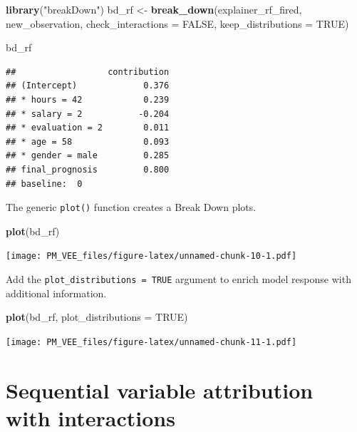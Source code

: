 \documentclass[]{krantz}
\newenvironment{Shaded}{\begin{snugshade}}{\end{snugshade}}
\newcommand{\DataTypeTok}[1]{\textcolor[rgb]{0.13,0.29,0.53}{#1}}
\newcommand{\KeywordTok}[1]{\textcolor[rgb]{0.13,0.29,0.53}{\textbf{#1}}}
\newcommand{\NormalTok}[1]{#1}
\newcommand{\OtherTok}[1]{\textcolor[rgb]{0.56,0.35,0.01}{#1}}
\newcommand{\StringTok}[1]{\textcolor[rgb]{0.31,0.60,0.02}{#1}}
\theoremstyle{definition}
\theoremstyle{definition}
\theoremstyle{definition}
\theoremstyle{remark}
\begin{document}
\begin{Shaded}
\begin{Highlighting}[]
\KeywordTok{library}\NormalTok{(}\StringTok{"breakDown"}\NormalTok{)}
\NormalTok{bd_rf <-}\StringTok{ }\KeywordTok{break_down}\NormalTok{(explainer_rf_fired,}
\NormalTok{                 new_observation,}
                 \DataTypeTok{check_interactions =} \OtherTok{FALSE}\NormalTok{,}
                 \DataTypeTok{keep_distributions =} \OtherTok{TRUE}\NormalTok{)}

\NormalTok{bd_rf}
\end{Highlighting}
\end{Shaded}

\begin{verbatim}
##                  contribution
## (Intercept)             0.376
## * hours = 42            0.239
## * salary = 2           -0.204
## * evaluation = 2        0.011
## * age = 58              0.093
## * gender = male         0.285
## final_prognosis         0.800
## baseline:  0
\end{verbatim}

The generic \texttt{plot()} function creates a Break Down plots.

\begin{Shaded}
\begin{Highlighting}[]
\KeywordTok{plot}\NormalTok{(bd_rf) }
\end{Highlighting}
\end{Shaded}

\texttt{[image: PM\_VEE\_files/figure-latex/unnamed-chunk-10-1.pdf]}

Add the \texttt{plot\_distributions\ =\ TRUE} argument to enrich model
response with additional information.

\begin{Shaded}
\begin{Highlighting}[]
\KeywordTok{plot}\NormalTok{(bd_rf, }\DataTypeTok{plot_distributions =} \OtherTok{TRUE}\NormalTok{) }
\end{Highlighting}
\end{Shaded}

\texttt{[image: PM\_VEE\_files/figure-latex/unnamed-chunk-11-1.pdf]}

\hypertarget{sequential-variable-attribution-with-interactions}{%
\section{Sequential variable attribution with
interactions}\label{sequential-variable-attribution-with-interactions}}
\end{document}
